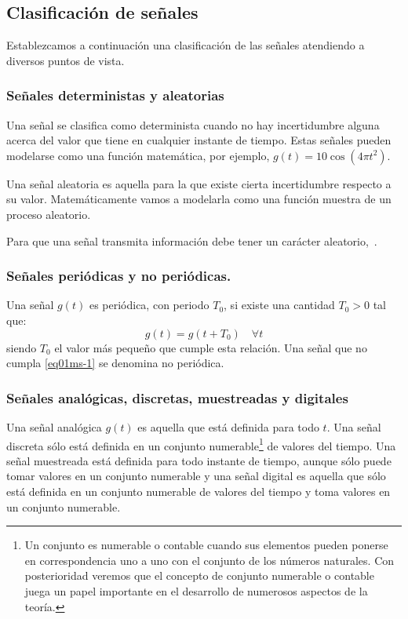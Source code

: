 \subsection{Clasificación de señales}%
Establezcamos a continuación una clasificación de las señales atendiendo a diversos puntos de vista.
%
\subsubsection*{Señales deterministas y aleatorias}
%
Una señal se clasifica como determinista cuando no hay incertidumbre alguna acerca del valor que tiene en cualquier instante de tiempo. Estas señales pueden modelarse como una función matemática, por ejemplo, $g\left( {t} \right) = 10 \cos\left( {4\pi t^{2}} \right)$. 

Una señal aleatoria es aquella para la que existe cierta incertidumbre respecto a su valor. Matemáticamente vamos a modelarla como una función muestra de un proceso aleatorio.

Para que una señal transmita información debe tener un carácter aleatorio,~\cite{wiener}. 
%
\subsubsection*{Señales periódicas y no periódicas.}
%
Una señal $g(t)$ es periódica, con periodo $T_{0}$, si existe una cantidad $T_{0} >$0 tal que:
\begin{equation}
\label{eq01ms-1}
g(t)=g(t+T_0 )\quad \forall t
\end{equation}siendo $T_{0}$ el valor más pequeño que cumple esta relación. Una señal que no cumpla \eqref{eq01ms-1} se denomina no periódica.
%
\subsubsection*{Señales analógicas, discretas, muestreadas y digitales}
%
Una señal analógica $g(t)$ es aquella que está definida para todo $t$. Una señal discreta sólo está definida en un conjunto numerable\footnote{\label{foot02-01}Un conjunto  es numerable o contable cuando sus elementos pueden ponerse en correspondencia uno a uno con el conjunto de los números naturales. Con posterioridad veremos que el concepto de conjunto numerable o contable juega un papel importante en el desarrollo de numerosos aspectos de la teoría.} de valores del tiempo. Una señal muestreada está definida para todo instante de tiempo, aunque sólo puede tomar valores en un conjunto numerable y una señal digital es aquella que sólo está definida en un conjunto numerable de valores del tiempo y toma valores en un conjunto numerable.
%





\captionsetup[figure]{textformat=period}
\endinput

